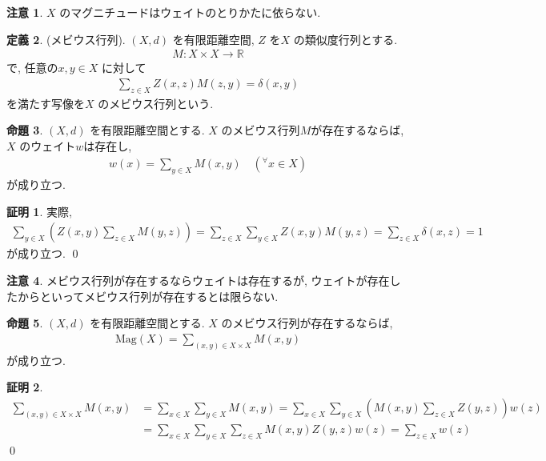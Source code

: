 \documentclass[10pt, fleqn, label-section=none]{bxjsarticle}
\theoremstyle{definition}
\newtheorem{dfn}{定義}[section]
\newtheorem{prop}[dfn]{命題}
\newtheorem*{pf*}{証明}
\newtheorem{remark}[dfn]{注意}
\newcommand{\any}{{}^{\forall}}
\renewcommand{\;}{\, ; \,}
\newcommand{\Mag}{\textrm{Mag}}
\begin{document}
\begin{remark}$X$ のマグニチュードはウェイトのとりかたに依らない. 

\end{remark}



\begin{dfn}(メビウス行列). $(X, d)$ を有限距離空間, $Z$ を$X$ の類似度行列とする. 
\begin{align*} M: X \times X \rightarrow \mathbb R\end{align*} 
で, 任意の$x,y \in X$ に対して
\begin{align*} \sum_{z \in X} Z(x, z) M(z, y) = \delta (x,y) \end{align*}
を満たす写像を$X$ のメビウス行列という. 
\end{dfn}

\begin{prop}\label{1703}$(X, d)$ を有限距離空間とする. $X$ のメビウス行列$M$が存在するならば, $X$ のウェイト$w$は存在し, 
\begin{align*} w(x) = \sum_{y \in X} M(x, y) \quad (\any x \in X)\end{align*}
が成り立つ. 
\end{prop}
\begin{pf*}
実際, 
\begin{align*} \sum_{y \in X} (Z(x,y) \sum_{z \in X} M(y, z) )= \sum_{z \in X} \sum_{y \in X} Z(x, y)M(y, z) = \sum_{z \in X} \delta(x, z) = 1   \end{align*}
が成り立つ. 
\qed
\end{pf*}

\begin{remark}メビウス行列が存在するならウェイトは存在するが, ウェイトが存在したからといってメビウス行列が存在するとは限らない. 

\end{remark}




\begin{prop}$(X, d)$ を有限距離空間とする. $X$ のメビウス行列が存在するならば, 
\begin{align*} \Mag(X) = \sum_{(x, y) \in X \times X} M(x,y) \end{align*}
が成り立つ.
\end{prop}
\begin{pf*}
\begin{align*} \sum_{(x, y) \in X \times X} M(x,y) &= \sum_{x \in X} \sum_{y \in X} M(x,y) = \sum_{x \in X} \sum_{y \in X} (M(x,y) \sum_{z \in X} Z(y, z) )w(z) \\ &= \sum_{x\in X} \sum_{y\in X}  \sum_{z\in X} M(x, y)Z(y, z) w(z) =  \sum_{z \in X} w(z)   \end{align*}
\qed
\end{pf*}
\end{document}
